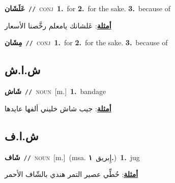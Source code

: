 \documentclass[10pt,a4paper,twoside]{article} %
\begin{document}
\begin{multicols}{2}
{\setlength\topsep{0pt}\textbf{\foreignlanguage{arabic}{عَلَشَان}}\ {\color{gray}\texttt{//}\color{black}}\ \textsc{conj}\ \textbf{1.}~for  \textbf{2.}~for the sake.  \textbf{3.}~because of\  \begin{flushright}\color{gray}\foreignlanguage{arabic}{\textbf{\underline{\foreignlanguage{arabic}{أمثلة}}}: عَلشانك يامعلم رخَّصنا الأسعار}\end{flushright}\color{black}} \vspace{2mm}

{\setlength\topsep{0pt}\textbf{\foreignlanguage{arabic}{مِشَان}}\ {\color{gray}\texttt{//}\color{black}}\ \textsc{conj}\ \textbf{1.}~for  \textbf{2.}~for the sake.  \textbf{3.}~because of\ } \vspace{2mm}

\vspace{-3mm}
\subsection*{\color{blue}\foreignlanguage{arabic}{ش.ا.ش}\color{blue}{ (ntws)}} 

{\setlength\topsep{0pt}\textbf{\foreignlanguage{arabic}{شَاش}}\ {\color{gray}\texttt{//}\color{black}}\ \textsc{noun}\ [m.]\ \textbf{1.}~bandage\  \begin{flushright}\color{gray}\foreignlanguage{arabic}{\textbf{\underline{\foreignlanguage{arabic}{أمثلة}}}: جيب شاش خليني ألفها عايدها}\end{flushright}\color{black}} \vspace{2mm}

\vspace{-3mm}
\subsection*{\color{blue}\foreignlanguage{arabic}{ش.ا.ف}\color{blue}{ (ntws)}} 

{\setlength\topsep{0pt}\textbf{\foreignlanguage{arabic}{شَاف}}\ {\color{gray}\texttt{//}\color{black}}\ \textsc{noun}\ [m.]\ \color{gray}(msa. \foreignlanguage{arabic}{إِبريق}~\foreignlanguage{arabic}{\textbf{١.}})\color{black}\ \textbf{1.}~jug\  \begin{flushright}\color{gray}\foreignlanguage{arabic}{\textbf{\underline{\foreignlanguage{arabic}{أمثلة}}}: حُطِّي عصير التمر هندي بالشّاف الأحمر}\end{flushright}\color{black}} \vspace{2mm}


\end{multicols}
\end{document}
